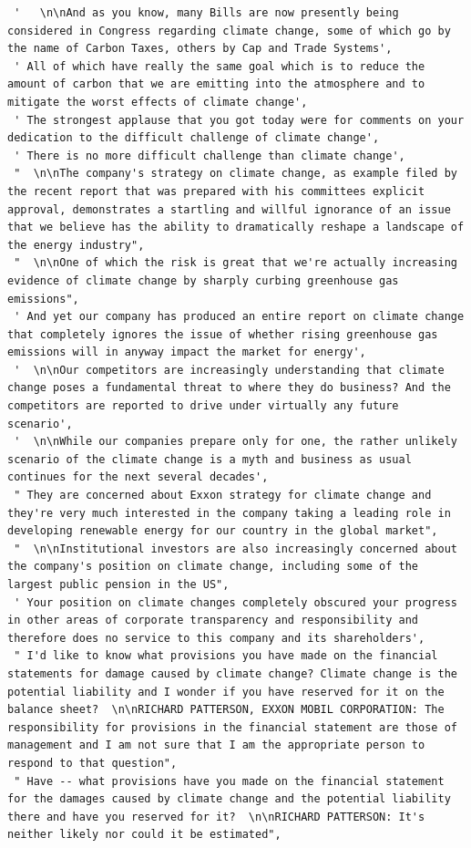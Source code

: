 \documentclass[
  letterpaper,
  DIV=11,
  numbers=noendperiod]{scrreprt}
\begin{document}
\begin{verbatim}
 '   \n\nAnd as you know, many Bills are now presently being considered in Congress regarding climate change, some of which go by the name of Carbon Taxes, others by Cap and Trade Systems',
 ' All of which have really the same goal which is to reduce the amount of carbon that we are emitting into the atmosphere and to mitigate the worst effects of climate change',
 ' The strongest applause that you got today were for comments on your dedication to the difficult challenge of climate change',
 ' There is no more difficult challenge than climate change',
 "  \n\nThe company's strategy on climate change, as example filed by the recent report that was prepared with his committees explicit approval, demonstrates a startling and willful ignorance of an issue that we believe has the ability to dramatically reshape a landscape of the energy industry",
 "  \n\nOne of which the risk is great that we're actually increasing evidence of climate change by sharply curbing greenhouse gas emissions",
 ' And yet our company has produced an entire report on climate change that completely ignores the issue of whether rising greenhouse gas emissions will in anyway impact the market for energy',
 '  \n\nOur competitors are increasingly understanding that climate change poses a fundamental threat to where they do business? And the competitors are reported to drive under virtually any future scenario',
 '  \n\nWhile our companies prepare only for one, the rather unlikely scenario of the climate change is a myth and business as usual continues for the next several decades',
 " They are concerned about Exxon strategy for climate change and they're very much interested in the company taking a leading role in developing renewable energy for our country in the global market",
 "  \n\nInstitutional investors are also increasingly concerned about the company's position on climate change, including some of the largest public pension in the US",
 ' Your position on climate changes completely obscured your progress in other areas of corporate transparency and responsibility and therefore does no service to this company and its shareholders',
 " I'd like to know what provisions you have made on the financial statements for damage caused by climate change? Climate change is the potential liability and I wonder if you have reserved for it on the balance sheet?  \n\nRICHARD PATTERSON, EXXON MOBIL CORPORATION: The responsibility for provisions in the financial statement are those of management and I am not sure that I am the appropriate person to respond to that question",
 " Have -- what provisions have you made on the financial statement for the damages caused by climate change and the potential liability there and have you reserved for it?  \n\nRICHARD PATTERSON: It's neither likely nor could it be estimated",

\end{verbatim}
\end{document}
